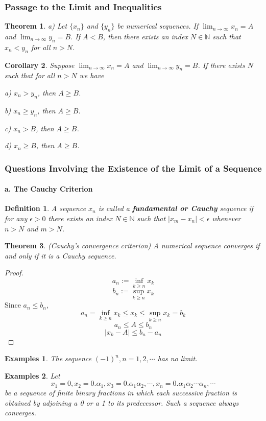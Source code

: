 \documentclass[a4paper,12pt]{article} %
\newtheorem{definition}{Definition}[section]
\newtheorem{theorem}{Theorem}[section]
\newtheorem{corollary}[theorem]{Corollary}
\newtheorem{example}{Examples}
\begin{document}
\subsubsection{Passage to the Limit and Inequalities}
\begin{theorem}
    \emph{
    {\rm a) } Let $\{x_n\}$ and $\{y_n\}$ be numerical sequences. If $\displaystyle \lim_{n\to \infty}
    x_n =A$ and $\displaystyle \lim_{n\to \infty} y_n =B$. If $A < B$, then there exists an 
    index $N \in \mathbb{N}$ such that $x_n < y_n$  for all $n > N$.
    }
\end{theorem}
\begin{corollary}
    Suppose $\displaystyle \lim_{n\to \infty}
    x_n =A$ and $\displaystyle \lim_{n\to \infty} y_n =B$.
    If there exists $N$ such that for all $n > N$ we have 

    {\rm a)} $x_n > y_n$, then $A \ge B$.

    {\rm b)} $x_n \ge y_n$, then $A \ge B$.

    {\rm c)} $x_n > B$, then $A \ge B$.

    {\rm d)} $x_n \ge B$, then $A \ge B$.
\end{corollary}

\subsubsection{Questions Involving the Existence of the Limit of a Sequence}
\paragraph{{\rm \textbf{ a. The Cauchy Criterion}}}
\begin{definition}
    \emph{
    A sequence ${x_n}$ is called a \textbf{fundamental or Cauchy} sequence 
    if for any $\epsilon > 0$ there exists an index $N \in \mathbb{N}$
    such that $|x_m - x_n| < \epsilon$ whenever $n > N$ and $m > N$.
    }
\end{definition}
\begin{theorem}{(Cauchy's convergence criterion)}
    \emph{
    A numerical sequence converges if and only if it is a Cauchy sequence.
    }
\end{theorem}
\begin{proof}
    \[a_n := \inf_{k\ge n} x_k\]
    \[b_n:= \sup_{k\ge n} x_k\]
    Since $a_n \le b_n$, 
    \[a_n = \inf_{k\ge n} x_k \le x_k \le \sup_{k\ge n} x_k = b_k\]
    \[a_n \le A \le b_n\]
    \[\left|x_k - A\right| \le b_n - a_n\]
\end{proof}
\begin{example}
    The sequence $(-1)^n, n = 1,2,\cdots$ has no limit.
\end{example}
\begin{example}
    Let \[x_1 = 0, x_2 = 0.\alpha_1, x_3 = 0.\alpha_1\alpha_2, \cdots, x_n = 0.\alpha_1\alpha_2\cdots\alpha_n, \cdots\]
    be a sequence of finite binary fractions in which each successive
    fraction is obtained by adjoining a 0 or a 1 to its predecessor. 
    Such a sequence always converges.
\end{example}
\end{document}
